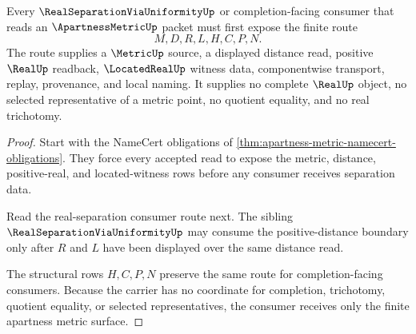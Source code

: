 \begin{theorem}
\label{thm:apartness-metric-real-separation-consumer}
Every $\RealSeparationViaUniformityUp$ or completion-facing consumer that reads an $\ApartnessMetricUp$ packet must first expose the finite route
$$
M,D,R,L,H,C,P,N.
$$
The route supplies a $\MetricUp$ source, a displayed distance read, positive $\RealUp$ readback, $\LocatedRealUp$ witness data, componentwise transport, replay, provenance, and local naming. It supplies no complete $\RealUp$ object, no selected representative of a metric point, no quotient equality, and no real trichotomy.
\end{theorem}
\begin{proof}
Start with the NameCert obligations of \autoref{thm:apartness-metric-namecert-obligations}. They force every accepted read to expose the metric, distance, positive-real, and located-witness rows before any consumer receives separation data.

Read the real-separation consumer route next. The sibling $\RealSeparationViaUniformityUp$ may consume the positive-distance boundary only after $R$ and $L$ have been displayed over the same distance read.

The structural rows $H,C,P,N$ preserve the same route for completion-facing consumers. Because the carrier has no coordinate for completion, trichotomy, quotient equality, or selected representatives, the consumer receives only the finite apartness metric surface.
\end{proof}




